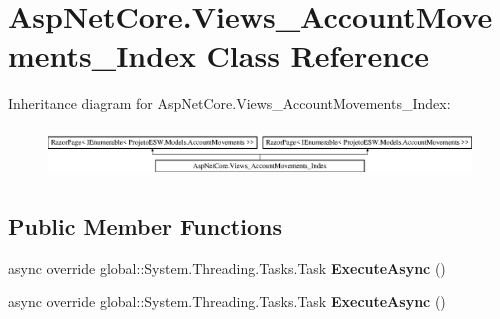 \hypertarget{class_asp_net_core_1_1_views___account_movements___index}{}\section{Asp\+Net\+Core.\+Views\+\_\+\+Account\+Movements\+\_\+\+Index Class Reference}
\label{class_asp_net_core_1_1_views___account_movements___index}
Inheritance diagram for Asp\+Net\+Core.\+Views\+\_\+\+Account\+Movements\+\_\+\+Index\+:\begin{figure}[H]
\begin{center}
\leavevmode
\includegraphics[height=1.327014cm]{class_asp_net_core_1_1_views___account_movements___index}
\end{center}
\end{figure}
\subsection*{Public Member Functions}
\begin{DoxyCompactItemize}
\item 
\mbox{\label{class_asp_net_core_1_1_views___account_movements___index_a479af264e85dc0566de0bbdca636289f}} 
async override global\+::\+System.\+Threading.\+Tasks.\+Task {\bfseries Execute\+Async} ()
\item 
\mbox{\label{class_asp_net_core_1_1_views___account_movements___index_a479af264e85dc0566de0bbdca636289f}} 
async override global\+::\+System.\+Threading.\+Tasks.\+Task {\bfseries Execute\+Async} ()
\end{DoxyCompactItemize}
